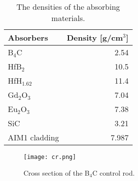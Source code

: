 \begin{table}
	\caption{The densities of the absorbing materials.}
	\vspace{0.05in}
	\begin{center}	
		\begin{tabular}{l  r}  %
			\hline
			Absorbers & Density [g/cm$^3$]\\
			\hline
			B$_4$C   &  2.54 \\
			HfB$_2$   &  10.5 \\
			HfH$_{1.62}$  &  11.4 \\
			Gd$_2$O$_3$   &  7.04 \\
			Eu$_2$O$_3$  &  7.38 \\
			SiC   & 3.21 \\
			AIM1 cladding   & 7.987 \\
			\hline
		\end{tabular}
		\label{tab:table111}
	\end{center}
\end{table}

%
%
%
%
%

\begin{figure}[t!]  %
	\centering
	\hspace{+0.65in} 
	\texttt{[image: cr.png]}
	\caption{Cross section of the B$_4$C control rod.}
	\label{fig:cr}
\end{figure}

